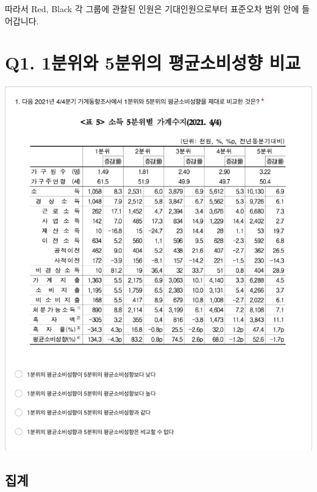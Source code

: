 \documentclass[
]{book}
\begin{document}
따라서 Red, Black 각 그룹에 관찰된 인원은 기대인원으로부터 표준오차 범위 안에 들어갑니다.

\section{Q1. 1분위와 5분위의 평균소비성향 비교}\label{q1.-1uxbd84uxc704uxc640-5uxbd84uxc704uxc758-uxd3c9uxade0uxc18cuxbe44uxc131uxd5a5-uxbe44uxad50}

\includegraphics[width=0.75\linewidth]{./pics/Quiz230510_Q1}

\subsection{집계}\label{uxc9d1uxacc4-42}
\end{document}
